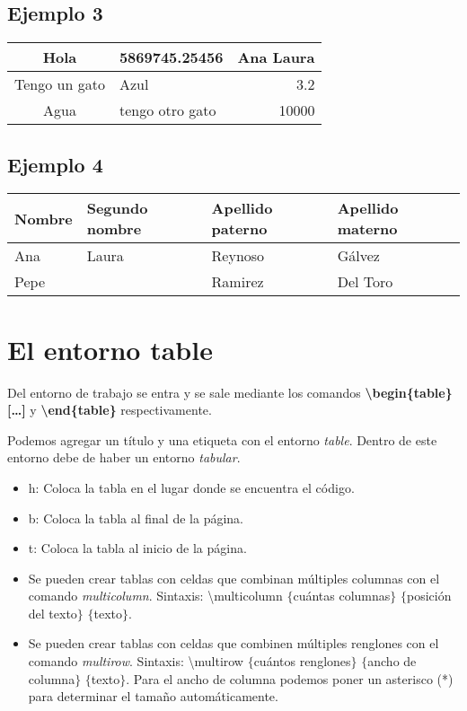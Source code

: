 \documentclass{article}
\begin{document}
\subsection{Ejemplo 3}
\begin{center} %
	\begin{tabular}{|c|l|r|||} \hline
		Hola & 5869745.25456   & Ana Laura \\ \hline
		Tengo un gato & Azul 		    & 3.2       \\ \hline \hline
		Agua 		  & tengo otro gato & 10000     \\ \hline 
	\end{tabular}
\end{center}

\subsection{Ejemplo 4}
\begin{tabular}{|l|l|l|l|} \hline
	\textbf{Nombre} & Segundo nombre & Apellido paterno & Apellido materno \\ \hline
	Ana	   & Laura          & Reynoso          & Gálvez			  \\ \cline{2-3}
	Pepe   &                & Ramirez		   & Del Toro         \\ \hline
\end{tabular}




\newpage
\section{El entorno table}
Del entorno de trabajo se entra y se sale mediante los comandos \textbf{\textbackslash begin\{table\} [\dots ]}  y \textbf{\textbackslash end\{table\}} respectivamente. 

Podemos agregar un título y una etiqueta con el entorno \textit{table}. Dentro de este entorno debe de haber un entorno \textit{tabular}.

\begin{itemize}
	\item h: Coloca la tabla en el lugar donde se encuentra el código.
	\item b: Coloca la tabla al final de la página.
	\item t: Coloca la tabla al inicio de la página. 
	\item Se pueden crear tablas con celdas que combinan múltiples columnas con el comando 					  \textit{multicolumn}. Sintaxis: \textbackslash multicolumn $\lbrace$cuántas columnas$\rbrace$ $\lbrace$posición del texto$\rbrace$ $\lbrace$texto$\rbrace$.
	\item Se pueden crear tablas con celdas que combinen múltiples renglones con el comando 				  \textit{multirow}. Sintaxis: \textbackslash multirow $\lbrace$cuántos renglones$\rbrace				$ $\lbrace$ancho de columna$\rbrace$ $\lbrace$texto$\rbrace$. Para el ancho de 						columna podemos poner un asterisco (*) para determinar el tamaño automáticamente.
\end{itemize}
\end{document}
